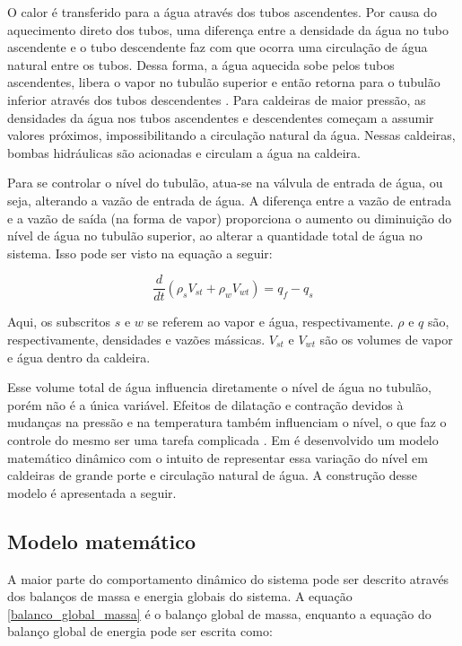 O calor é transferido para a água através dos tubos ascendentes. Por
causa do aquecimento direto dos tubos, uma diferença entre a densidade
da água no tubo ascendente e o tubo descendente faz com que ocorra uma
circulação de água natural entre os tubos. Dessa forma, a água
aquecida sobe pelos tubos ascendentes, libera o vapor no tubulão
superior e então retorna para o tubulão inferior através dos tubos
descendentes \cite{ufrj}. Para caldeiras de maior pressão, as
densidades da água nos tubos ascendentes e descendentes começam a
assumir valores próximos, impossibilitando a circulação natural da
água. Nessas caldeiras, bombas hidráulicas são acionadas e circulam a
água na caldeira.

Para se controlar o nível do tubulão, atua-se na válvula de entrada de
água, ou seja, alterando a vazão de entrada de água. A
diferença entre a vazão de entrada e a vazão de saída (na forma de
vapor) proporciona o aumento ou diminuição do nível de água no tubulão
superior, ao alterar a quantidade total de água no sistema. Isso pode
ser visto na equação a seguir:


\begin{equation}
  \dfrac{d}{dt} (\rho_s V_{st} + \rho_w V_{wt}) = q_f - q_s
  \label{balanco_global_massa}
\end{equation}

Aqui, os subscritos $s$ e $w$ se referem ao vapor e água,
respectivamente. $\rho$ e $q$ são, respectivamente, densidades
e vazões mássicas. $V_{st}$ e $V_{wt}$ são os volumes de vapor e água
dentro da caldeira.


Esse volume total de água influencia diretamente o nível de água no
tubulão, porém não é a única variável. Efeitos de dilatação e
contração devidos à mudanças na pressão e na temperatura também
influenciam o nível, o que faz o controle do mesmo ser uma tarefa
complicada \cite{astrom}. Em  é desenvolvido um
modelo matemático dinâmico com o intuito de representar essa variação
do nível em caldeiras de grande porte e circulação natural de
água. A construção desse modelo é apresentada a seguir.

\subsection{Modelo matemático}

A maior parte do comportamento dinâmico do sistema pode ser descrito
através dos balanços de massa e energia globais do sistema. A equação
\ref{balanco_global_massa} é o balanço global de massa, enquanto a equação do
balanço global de energia pode ser escrita como:

